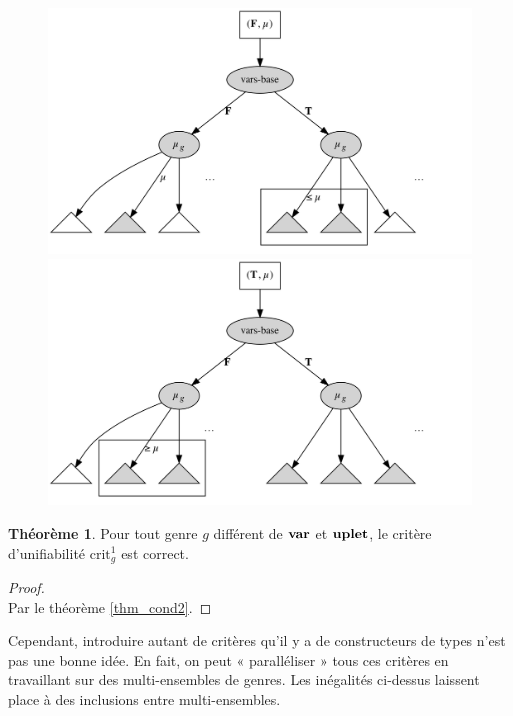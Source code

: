 \documentclass[a4paper]{report}
\newenvironment{preuve} 
  {\begin{proof}~\\} 
  {\end{proof}}
\theoremstyle{definition}
\newtheorem{theoreme}{Théorème}
\begin{document}
\begin{figure}[h]
  \begin{center}
    \includegraphics[scale=0.13]{graphs/crit2_1}
    \includegraphics[scale=0.13]{graphs/crit2_2}
  \end{center}
  \caption{\label{fig_crit2}}
\end{figure}

\begin{theoreme} \label{thm_crit2g}
  Pour tout genre $g$ différent de $\bold{var}$ et $\bold{uplet}$, le critère d'unifiabilité $\mathrm{crit}^1_g$ est correct.
\end{theoreme}

\begin{preuve}
  Par le théorème \ref{thm_cond2}.
\end{preuve}

Cependant, introduire autant de critères qu'il y a de constructeurs de types n'est pas une bonne idée. En fait, on peut « paralléliser » tous ces critères en travaillant sur des multi-ensembles de genres. Les inégalités ci-dessus laissent place à des inclusions entre multi-ensembles.
\end{document}
